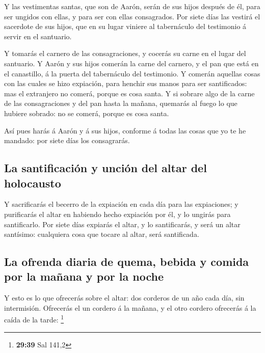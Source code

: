  Y las vestimentas santas, que son de Aarón, serán de sus
hijos después de él, para ser ungidos con ellas, y para ser con ellas
consagrados.  Por siete días las vestirá el sacerdote de
sus hijos, que en su lugar viniere al tabernáculo del testimonio á
servir en el santuario.

 Y tomarás el carnero de las consagraciones, y cocerás su
carne en el lugar del santuario.  Y Aarón y sus hijos
comerán la carne del carnero, y el pan que está en el canastillo, á la
puerta del tabernáculo del testimonio.  Y comerán aquellas
cosas con las cuales se hizo expiación, para henchir sus manos para ser
santificados: mas el extranjero no comerá, porque es cosa santa.
 Y si sobrare algo de la carne de las consagraciones y del
pan hasta la mañana, quemarás al fuego lo que hubiere sobrado: no se
comerá, porque es cosa santa.

 Así pues harás á Aarón y á sus hijos, conforme á todas las
cosas que yo te he mandado: por siete días los consagrarás.

\hypertarget{la-santificaciuxf3n-y-unciuxf3n-del-altar-del-holocausto}{%
\subsection{La santificación y unción del altar del
holocausto}\label{la-santificaciuxf3n-y-unciuxf3n-del-altar-del-holocausto}}

 Y sacrificarás el becerro de la expiación en cada día para
las expiaciones; y purificarás el altar en habiendo hecho expiación por
él, y lo ungirás para santificarlo.  Por siete días
expiarás el altar, y lo santificarás, y será un altar santísimo:
cualquiera cosa que tocare al altar, será santificada.

\hypertarget{la-ofrenda-diaria-de-quema-bebida-y-comida-por-la-mauxf1ana-y-por-la-noche}{%
\subsection{La ofrenda diaria de quema, bebida y comida por la mañana y
por la
noche}\label{la-ofrenda-diaria-de-quema-bebida-y-comida-por-la-mauxf1ana-y-por-la-noche}}

 Y esto es lo que ofrecerás sobre el altar: dos corderos de
un año cada día, sin intermisión.  Ofrecerás el un cordero
á la mañana, y el otro cordero ofrecerás á la caída de la tarde:
\footnote{\textbf{29:39} Sal 141,2}

